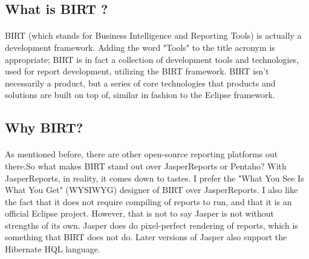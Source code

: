 \subsection{What is BIRT ?}
\paragraph{}
BIRT (which stands for Business Intelligence and Reporting Tools) is actually a development framework. Adding the word "Tools" to the title acronym is appropriate; BIRT is in fact a collection of development tools and technologies, used for report development, utilizing the BIRT framework. BIRT isn't necessarily a product, but a series of core technologies that products and solutions are built on top of, similar in fashion to the Eclipse framework.

\subsection{Why BIRT?}
\paragraph{}
As mentioned before, there are other open-source reporting platforms out there.So what makes BIRT stand out over JasperReports or Pentaho? With JasperReports, in reality, it comes down to tastes. I prefer the "What You See Is What You Get" (WYSIWYG) designer of BIRT over JasperReports. I also like the fact that it does not require compiling of reports to run, and that it is an official Eclipse project. However, that is not to say Jasper is not without strengths of its own. Jasper does do pixel-perfect rendering of reports, which is something that BIRT does not do. Later
versions of Jasper also support the Hibernate HQL language.